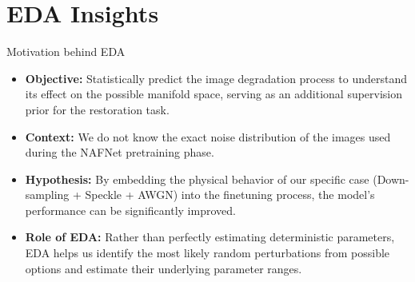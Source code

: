 \documentclass[aspectratio=169,xcolor=dvipsnames]{beamer}
\begin{document}
\section{EDA Insights}

\begin{frame}{Motivation behind EDA}
  \begin{itemize}
    \item \textbf{Objective:} Statistically predict the image degradation process to understand its effect on the possible manifold space, serving as an additional supervision prior for the restoration task.
    \item \textbf{Context:} We do not know the exact noise distribution of the images used during the NAFNet pretraining phase.
    \item \textbf{Hypothesis:} By embedding the physical behavior of our specific case (Down-sampling + Speckle + AWGN) into the finetuning process, the model's performance can be significantly improved.
    \item \textbf{Role of EDA:} Rather than perfectly estimating deterministic parameters, EDA helps us identify the most likely random perturbations from possible options and estimate their underlying parameter ranges.
  \end{itemize}
\end{frame}
\end{document}

